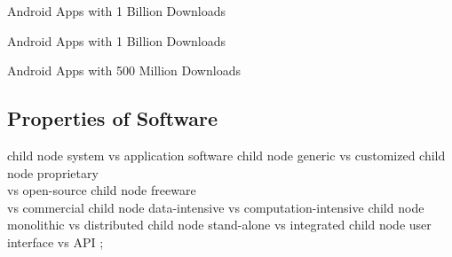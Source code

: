 \begin{frame}{Android Apps with 1 Billion Downloads }
	\centering{}
\end{frame}

\begin{frame}{Android Apps with 1 Billion Downloads }
	\centering{}
\end{frame}

\begin{frame}{Android Apps with 500 Million Downloads}
	\centering{}
\end{frame}

\subsection{Properties of Software}
\begin{frame}{\insertsubsection}
	\centering\tikz[grow cyclic,
	mindmap, every node/.style=concept,concept color=blue!10!background,
	level 1/.append style={level distance=27mm,sibling angle=360/8}]
	child { node {system vs\phantom{;} application software\phantom{ab}} }
	child { node {generic vs customized} }
	child { node {proprietary\\vs open-source} }
	child { node {freeware\\vs commercial} }
	child { node {data-intensive vs computation-intensive} }
	child { node {monolithic vs distributed} }
	child { node {stand-alone vs integrated} }
	child { node {user interface vs API\phantom{ab}} }
	;
\end{frame}


